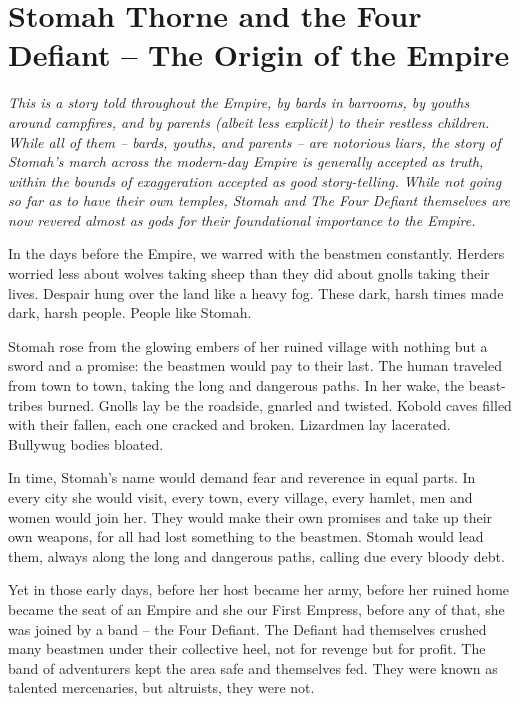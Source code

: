 \section{Stomah Thorne and the Four Defiant -- The Origin of the Empire}

\textit{This is a story told throughout the Empire, by bards in barrooms, by youths around
  campfires, and by parents (albeit less explicit) to their restless children.
While all of them -- bards, youths, and parents -- are notorious liars, the story of Stomah's
  march across the modern-day Empire is generally accepted as truth, within the bounds of
  exaggeration accepted as good story-telling.
While not going so far as to have their own temples, Stomah and The Four Defiant themselves are now
  revered almost as gods for their foundational importance to the Empire.}

\medskip

In the days before the Empire, we warred with the beastmen constantly.
Herders worried less about wolves taking sheep than they did about gnolls taking their lives.
Despair hung over the land like a heavy fog.
These dark, harsh times made dark, harsh people.
People like Stomah.

Stomah rose from the glowing embers of her ruined village with nothing but a sword and a promise:
  the beastmen would pay to their last.
The human traveled from town to town, taking the long and dangerous paths.
In her wake, the beast-tribes burned.
Gnolls lay be the roadside, gnarled and twisted.
Kobold caves filled with their fallen, each one cracked and broken.
Lizardmen lay lacerated.
Bullywug bodies bloated.

In time, Stomah's name would demand fear and reverence in equal parts.
In every city she would visit, every town, every village, every hamlet,
  men and women would join her.
They would make their own promises and take up their own weapons, for all had lost something
  to the beastmen.
Stomah would lead them, always along the long and dangerous paths, calling due every bloody debt.

Yet in those early days, before her host became her army, before her ruined home became the seat of
  an Empire and she our First Empress, before any of that, she was joined by a band
  -- the Four Defiant.
The Defiant had themselves crushed many beastmen under their collective heel,
  not for revenge but for profit.
The band of adventurers kept the area safe and themselves fed.
They were known as talented mercenaries, but altruists, they were not.

